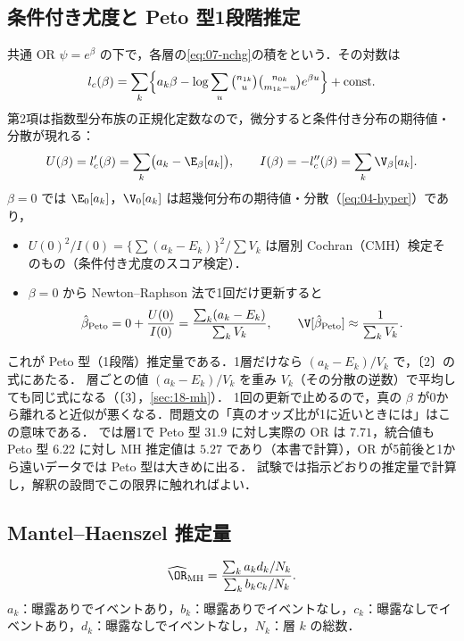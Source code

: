 \subsection{条件付き尤度と Peto 型1段階推定}\label{subsec:07-peto}
共通 OR $\psi=e^\beta$ の下で，各層の\cref{eq:07-nchg}の積をという．その対数は
\[
l_c(\beta)=\sum_k\Bigl\{a_k\beta-\log\sum_u\tbinom{n_{1k}}{u}\tbinom{n_{0k}}{m_{1k}-u}e^{\beta u}\Bigr\}+\text{const}.
\]
第2項は指数型分布族の正規化定数なので，微分すると条件付き分布の期待値・分散が現れる：
\begin{equation}
U(\beta)=l_c'(\beta)=\sum_k\bigl(a_k-\E_\beta[a_k]\bigr),\qquad I(\beta)=-l_c''(\beta)=\sum_k\V_\beta[a_k].\label{eq:07-condscore}
\end{equation}
$\beta=0$ では $\E_0[a_k]$，$\V_0[a_k]$ は超幾何分布の期待値・分散（\cref{eq:04-hyper}）であり，
\begin{itemize}
\item $U(0)^2/I(0)=\{\sum(a_k-E_k)\}^2/\sum V_k$ は層別 Cochran（CMH）検定そのもの（条件付き尤度のスコア検定）．
\item $\beta=0$ から Newton--Raphson 法で1回だけ更新すると
\begin{equation}
\hat\beta_{\mathrm{Peto}}=0+\frac{U(0)}{I(0)}=\frac{\sum_k(a_k-E_k)}{\sum_kV_k},\qquad \V[\hat\beta_{\mathrm{Peto}}]\approx\frac1{\sum_kV_k}.\label{eq:07-peto}
\end{equation}
\end{itemize}
これが Peto 型（1段階）推定量である．1層だけなら $(a_k-E_k)/V_k$ で，〔2〕の式にあたる．
層ごとの値 $(a_k-E_k)/V_k$ を重み $V_k$（その分散の逆数）で平均しても同じ式になる（〔3〕，\cref{sec:18-mh}）．
\Youchui 1回の更新で止めるので，真の $\beta$ が0から離れると近似が悪くなる．問題文の「真のオッズ比が1に近いときには」はこの意味である．
 では層1で Peto 型 $31.9$ に対し実際の OR は $7.71$，統合値も Peto 型 $6.22$ に対し MH 推定値は $5.27$ であり（本書で計算），OR が5前後と1から遠いデータでは Peto 型は大きめに出る．
試験では指示どおりの推定量で計算し，解釈の設問でこの限界に触れればよい．

\subsection{Mantel--Haenszel 推定量}\label{subsec:07-mhest}
\begin{teigi}\label{def:07-mhor}
\begin{equation}
\widehat\OR_{\mathrm{MH}}=\frac{\sum_ka_kd_k/N_k}{\sum_kb_kc_k/N_k}.\label{eq:07-mhor}
\end{equation}
$a_k$：曝露ありでイベントあり，$b_k$：曝露ありでイベントなし，$c_k$：曝露なしでイベントあり，$d_k$：曝露なしでイベントなし，$N_k$：層 $k$ の総数．
\end{teigi}
